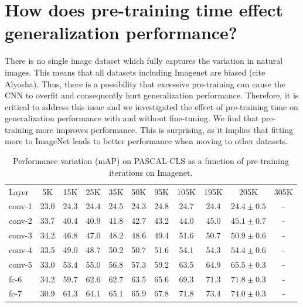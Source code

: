 \section{How does pre-training time effect generalization performance?}
\label{sec:speed}
There is no single image dataset which fully captures the variation in natural images. This means that all datasets including Imagenet are biased (cite Alyosha). Thus, there is a possibility that excessive pre-training can cause the CNN to overfit and consequently hurt generalization performance. Therefore, it is critical to address this issue and we investigated the effect of pre-training time on generalization performance with and without fine-tuning. We find that pre-training more improves performance. This is surprising, as it implies that fitting more to ImageNet leads to better performance when moving to other datasets. %

\setlength{\tabcolsep}{4pt}
\begin{table}[t!]
\begin{center}
\caption{Performance variation (mAP) on PASCAL-CLS as a function of pre-training iterations on Imagenet.}
\label{table:det-traj-classify}
\begin{tabular}{lcccccccccc}
\hline\noalign{\smallskip}
Layer  & 5K & 15K & 25K & 35K & 50K & 95K & 105K & 195K & 205K & 305K \\
\noalign{\smallskip}
\hline
\noalign{\smallskip}
conv-1 & 23.0 & 24.3 & 24.4 & 24.5 & 24.3 & 24.8 & 24.7 & 24.4 & $24.4 \pm 0.5$ & -\\
conv-2 & 33.7 & 40.4 & 40.9 & 41.8 & 42.7 & 43.2 & 44.0 & 45.0 & $45.1 \pm 0.7$ & -\\
conv-3 & 34.2 & 46.8 & 47.0 & 48.2 & 48.6 & 49.4 & 51.6 & 50.7 & $50.9 \pm 0.6$ & -\\
conv-4 & 33.5 & 49.0 & 48.7 & 50.2 & 50.7 & 51.6 & 54.1 & 54.3 & $54.4 \pm 0.6$ & -\\
conv-5 & 33.0 & 53.4 & 55.0 & 56.8 & 57.3 & 59.2 & 63.5 & 64.9 & $65.5 \pm 0.3$ & -\\
fc-6   & 34.2 & 59.7 & 62.6 & 62.7 & 63.5 & 65.6 & 69.3 & 71.3 & $71.8 \pm 0.3$ & -\\
fc-7   & 30.9 & 61.3 & 64.1 & 65.1 & 65.9 & 67.8 & 71.8 & 73.4 & $74.0 \pm 0.3$ & -\\
\hline
\end{tabular}
\end{center}
\end{table}
\setlength{\tabcolsep}{1.4pt}

